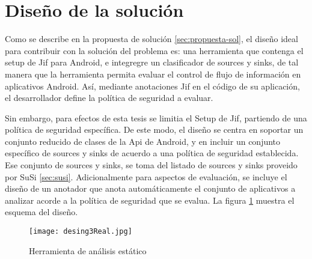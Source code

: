 
\section{Diseño de la solución}
Como se describe en la propuesta de solución \ref{sec:propuesta-sol}, el
diseño ideal para contribuir con la solución del problema es: una herramienta
que contenga el setup de Jif para Android, e integregre un clasificador de
sources y sinks, de tal manera que la herramienta permita evaluar el control de
flujo de información en aplicativos Android. Así, mediante anotaciones Jif en el
código de su aplicación, el desarrollador define la política de seguridad a evaluar.

Sin embargo, para efectos de esta tesis se limitia el Setup de Jif, partiendo de
una política de seguridad específica. De este modo, el diseño se centra en
soportar un conjunto reducido de clases de la Api de Android, y en incluir un
conjunto específico de sources y sinks de acuerdo a una política de seguridad
establecida. Ese conjunto de sources y sinks, se toma del listado de sources y
sinks proveido por SuSi \ref{sec:susi}.\newline 
Adicionalmente para aspectos de evaluación, se incluye el diseño de un anotador
que anota automáticamente el conjunto de aplicativos a analizar acorde a la
política de seguridad que se evalua. La figura \ref{fig:desingReal} muestra el
esquema del diseño.
\begin{figure}[t!]
	\begin{center} 
	\texttt{[image: desing3Real.jpg]} 
	\end{center}
	\caption{Herramienta de análisis estático  }
	\label{fig:desingReal}
\end{figure}

